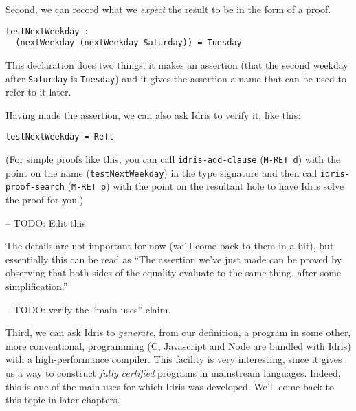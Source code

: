 Second, we can record what we \emph{expect} the result to be in the form
of a proof.

\begin{verbatim}
testNextWeekday :
  (nextWeekday (nextWeekday Saturday)) = Tuesday
\end{verbatim}

This declaration does two things: it makes an assertion (that the second
weekday after \texttt{Saturday} is
\texttt{Tuesday}) and it gives the assertion a name that
can be used to refer to it later.

Having made the assertion, we can also ask Idris to verify it, like
this:

\begin{verbatim}
testNextWeekday = Refl
\end{verbatim}

(For simple proofs like this, you can call
\texttt{idris-add-clause} (\texttt{M-RET d})
with the point on the name (\texttt{testNextWeekday}) in
the type signature and then call
\texttt{idris-proof-search} (\texttt{M-RET p})
with the point on the resultant hole to have Idris solve the proof for
you.)

-- TODO: Edit this

The details are not important for now (we'll come back to them in a
bit), but essentially this can be read as ``The assertion we've just
made can be proved by observing that both sides of the equality evaluate
to the same thing, after some simplification.''

-- TODO: verify the ``main uses'' claim.

Third, we can ask Idris to \emph{generate}, from our definition, a
program in some other, more conventional, programming (C, Javascript and
Node are bundled with Idris) with a high-performance compiler. This
facility is very interesting, since it gives us a way to construct
\emph{fully certified} programs in mainstream languages. Indeed, this is
one of the main uses for which Idris was developed. We'll come back to
this topic in later chapters.
